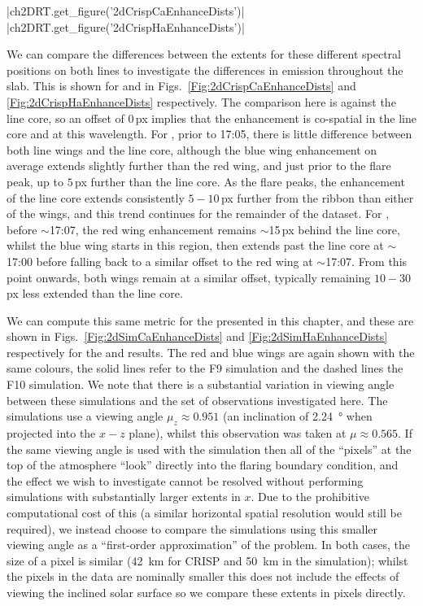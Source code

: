 \py[2DRT]|ch2DRT.get_figure('2dCrispCaEnhanceDists')|
\py[2DRT]|ch2DRT.get_figure('2dCrispHaEnhanceDists')|

We can compare the differences between the extents for these different spectral positions on both lines to investigate the differences in emission throughout the slab.
This is shown for \CaLine{} and \Ha{} in Figs.~\ref{Fig:2dCrispCaEnhanceDists} and \ref{Fig:2dCrispHaEnhanceDists} respectively.
The comparison here is against the line core, so an offset of $0$\,{}px implies that the enhancement is co-spatial in the line core and at this wavelength.
For \CaLine{}, prior to 17:05, there is little difference between both line wings and the line core, although the blue wing enhancement on average extends slightly further than the red wing, and just prior to the flare peak, up to $5$\,{}px further than the line core.
As the flare peaks, the enhancement of the line core extends consistently $5-10$\,{}px further from the ribbon than either of the wings, and this trend continues for the remainder of the dataset.
For \Ha{}, before $\sim$17:07, the red wing enhancement remains $\sim$15\,{}px behind the line core, whilst the blue wing starts in this region, then extends past the line core at $\sim$17:00 before falling back to a similar offset to the red wing at $\sim$17:07.
From this point onwards, both wings remain at a similar offset, typically remaining $10-30$\,{}px less extended than the line core.

We can compute this same metric for the  presented in this chapter, and these are shown in Figs.~\ref{Fig:2dSimCaEnhanceDists} and \ref{Fig:2dSimHaEnhanceDists} respectively for the \CaLine{} and \Ha{} results.
The red and blue wings are again shown with the same colours, the solid lines refer to the F9 simulation and the dashed lines the F10 simulation.
We note that there is a substantial variation in viewing angle between these simulations and the set of observations investigated here.
The simulations use a viewing angle $\mu_z\approx0.951$ (an inclination of \SI{2.24}{\degree} when projected into the $x-z$ plane), whilst this observation was taken at $\mu\approx0.565$.
If the same viewing angle is used with the simulation then all of the ``pixels'' at the top of the atmosphere ``look'' directly into the flaring boundary condition, and the effect we wish to investigate cannot be resolved without performing simulations with substantially larger extents in $x$.
Due to the prohibitive computational cost of this (a similar horizontal spatial resolution would still be required), we instead choose to compare the simulations using this smaller viewing angle as a ``first-order approximation'' of the problem.
In both cases, the size of a pixel is similar (\SI{42}{\kilo\metre} for CRISP and \SI{50}{\kilo\metre} in the simulation); whilst the pixels in the data are nominally smaller this does not include the effects of viewing the inclined solar surface so we compare these extents in pixels directly.

